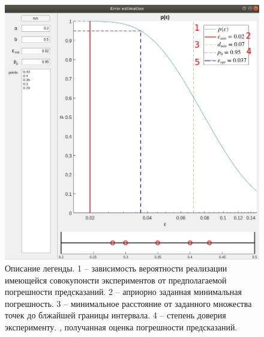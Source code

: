 \documentclass[a4paper,12pt]{article} %
\begin{document}
\begin{figure}[h!]
\begin{center}
\includegraphics[width=1\textwidth]{./pics/whole_window_numsLeg}
\end{center}
\caption{Описание легенды. 1 -- зависимость вероятности реализации имеющейся совокупонсти экспериментов от предполагаемой погрешности предсказаний. 2 -- априорно заданная минимальная погрешность. 3 -- минимальное расстояние от заданного множества точек до блжайшей границы интервала. 4 -- степень доверия эксперименту. , получанная оценка погрешности предсказаний.} \label{img:whole_numsLeg}
\end{figure}

\newpage

\printbibliography[heading=bibintoc]
\end{document}
